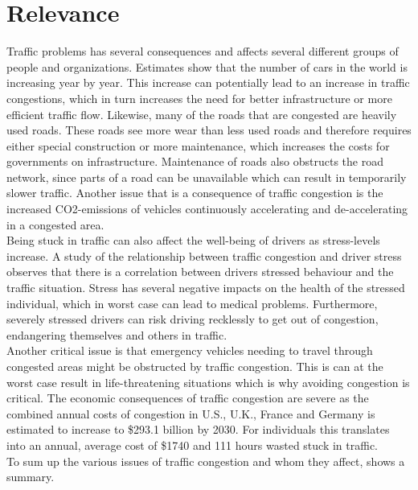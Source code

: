 \section{Relevance}
Traffic problems has several consequences and affects several different groups of people and organizations. Estimates show that the number of cars in the world is increasing year by year\cite{WardsAuto:CarPopulation}. This increase can potentially lead to an increase in traffic congestions, which in turn increases the need for better infrastructure or more efficient traffic flow. 
Likewise, many of the roads that are congested are heavily used roads. These roads see more wear than less used roads and therefore requires either special construction or more maintenance, which increases the costs for governments on infrastructure. Maintenance of roads also obstructs the road network, since parts of a road can be unavailable which can result in temporarily slower traffic.
Another issue that is a consequence of traffic congestion is the increased CO2-emissions of vehicles continuously accelerating and de-accelerating in a congested area\cite{BarthBoriboonsomsin2009}.\\
Being stuck in traffic can also affect the well-being of drivers as stress-levels increase. A study of the relationship between traffic congestion and driver stress observes that there is a correlation between drivers stressed behaviour and the traffic situation\cite{HennesyWiesenthal1997}\cite{StokolsNovacoStokolsCampell1978}. Stress has several negative impacts on the health of the stressed individual, which in worst case can lead to medical problems. Furthermore, severely stressed drivers can risk driving recklessly to get out of congestion, endangering themselves and others in traffic\cite{Shinar1998}. \\
Another critical issue is that emergency vehicles needing to travel through congested areas might be obstructed by traffic congestion. This is can at the worst case result in life-threatening situations which is why avoiding congestion is critical.
The economic consequences of traffic congestion are severe as the combined annual costs of congestion in U.S., U.K., France and Germany is estimated to increase to \$293.1 billion by 2030\cite{INRIX2013}. For		 individuals this translates into an annual, average cost of \$1740 and 111 hours wasted stuck in traffic.\\
To sum up the various issues of traffic congestion and whom they affect,  shows a summary.

